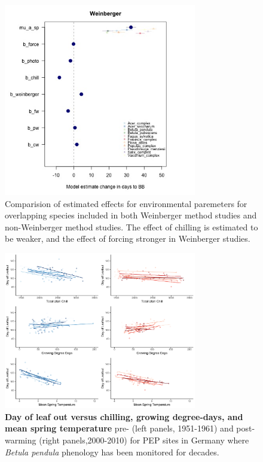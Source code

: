 \documentclass{article}
\begin{document}
\newpage
\begin{figure}[h!]
\centering
\noindent \includegraphics[width=0.75\textwidth]{..//..//analyses/figures/weinberger_MU_4supp.jpeg}
\caption{Comparision of estimated effects for environmental paremeters for overlapping species included in both Weinberger method studies and non-Weinberger method studies. The effect of chilling is estimated to be weaker, and the effect of forcing stronger in Weinberger studies.}
\label{fig:weinberger}
\end{figure}

\newpage
\begin{figure}[h!]
\centering
\noindent \includegraphics[width=0.75\textwidth]{..//..//analyses/bb_analysis/PEP_climate/figures/betpen_multruns_utahgddmat.pdf}
\caption{\textbf{Day of leaf out versus chilling, growing degree-days, and mean spring temperature} pre- (left panels, 1951-1961) and post- warming (right panels,2000-2010) for PEP sites in Germany where \emph{Betula pendula} phenology has been monitored for decades.}
\label{fig:pep}
\end{figure}
\end{document}
